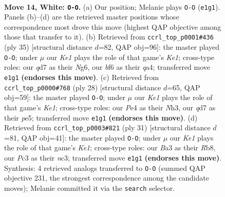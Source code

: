 \documentclass[11pt]{article}
\begin{document}
\clearpage

\begin{figure}[p]\centering
\begin{subfigure}{0.46\textwidth}\centering
\resizebox{\linewidth}{!}{%
\newchessgame
\chessboard[
  setfen={rn3rk1/p1pqpp1p/5bp1/3P4/2Q1P3/B1P4P/P4P1P/R3K2R w KQ - 1 14},
  showmover=false,
  pgfstyle=straightmove, color=movearrow, markmove={e1-g1}
]}
\caption{}
\end{subfigure}\hfill
\begin{subfigure}{0.46\textwidth}\centering
\resizebox{\linewidth}{!}{%
\newchessgame
\chessboard[
  setfen={r3k2r/b2q1ppp/p1p3n1/3pP3/Q7/1P3N1P/P4PP1/R1B2RK1 b kq - 2 18},
  showmover=false,
  pgfstyle=straightmove, color=movearrow, markmove={e8-g8}
]}
\caption{}
\end{subfigure}
\\[4pt]
\begin{subfigure}{0.46\textwidth}\centering
\resizebox{\linewidth}{!}{%
\newchessgame
\chessboard[
  setfen={r1b2rk1/pp4pp/q4n2/2P1pp2/2P5/PQ2PP1N/3B2PP/R3K2R w KQ - 0 15},
  showmover=false,
  pgfstyle=straightmove, color=movearrow, markmove={e1-g1}
]}
\caption{}
\end{subfigure}\hfill
\begin{subfigure}{0.46\textwidth}\centering
\resizebox{\linewidth}{!}{%
\newchessgame
\chessboard[
  setfen={1r2k2r/p1q2ppp/2p1pb2/8/2Q5/1PN3P1/P3PP1P/R4RK1 b k - 0 16},
  showmover=false,
  pgfstyle=straightmove, color=movearrow, markmove={e8-g8}
]}
\caption{}
\end{subfigure}
\caption{\textbf{Move 14, White: \texttt{O-O}.} (a) Our position; Melanie plays \texttt{O-O} (\texttt{e1g1}). Panels (b)--(d) are the retrieved master positions whose correspondence most drove this move (highest QAP objective among those that transfer to it). (b) Retrieved from \texttt{ccrl\_top\_p0001\#436} (ply 35) [structural distance $d$=82, QAP obj=96]: the master played \texttt{O-O}; under $\mu$ our \emph{Ke1} plays the role of that game's \emph{Ke1}; cross-type roles: our \emph{q}d7 as their \emph{N}g6, our \emph{b}f6 as their \emph{q}a4; transferred move \texttt{e1g1} \textbf{(endorses this move)}. (c) Retrieved from \texttt{ccrl\_top\_p0000\#768} (ply 28) [structural distance $d$=65, QAP obj=59]: the master played \texttt{O-O}; under $\mu$ our \emph{Ke1} plays the role of that game's \emph{Ke1}; cross-type roles: our \emph{P}e4 as their \emph{N}h3, our \emph{q}d7 as their \emph{p}e5; transferred move \texttt{e1g1} \textbf{(endorses this move)}. (d) Retrieved from \texttt{ccrl\_top\_p0003\#821} (ply 31) [structural distance $d$=81, QAP obj=41]: the master played \texttt{O-O}; under $\mu$ our \emph{Ke1} plays the role of that game's \emph{Ke1}; cross-type roles: our \emph{B}a3 as their \emph{R}b8, our \emph{P}c3 as their \emph{n}c3; transferred move \texttt{e1g1} \textbf{(endorses this move)}. Synthesis: 4 retrieved analogs transferred to \texttt{O-O} (summed QAP objective 231, the strongest correspondence among the candidate moves); Melanie committed it via the \texttt{search} selector.}
\label{fig:thought-m26}
\end{figure}
\end{document}
